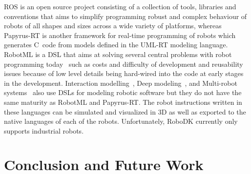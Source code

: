 \documentclass[runningheads]{llncs}
\newcommand{\cpp}{C\nolinebreak\hspace{-.05em}\raisebox{.4ex}{\tiny\bf +}\nolinebreak\hspace{-.10em}\raisebox{.4ex}{\tiny\bf +}}
\begin{document}
ROS is an open source project consisting of a collection of tools, libraries and conventions that aims to simplify programming robust and complex behaviour of robots of all shapes and sizes across a wide variety of platforms, whereas
Papyrus-RT is another framework for real-time programming of robots which generates \cpp\ code from models defined in the UML-RT modeling language.
RobotML is a DSL that aims at solving several central problems with robot programming today~\cite{Dhouib2012robotml} such as costs and difficulty of development and reusability issues because of low level details being hard-wired into the code at early stages in the development. 
Interaction modelling~\cite{cornelius2017model}, Deep modeling~\cite{atkinson2014towards}, and Multi-robot systems~\cite{di2014family} also use DSLs for modeling robotic software but they do not have the same maturity as RobotML and Papyrus-RT.
The robot instructions written in these languages can be simulated and visualized in 3D as well as exported to the native languages of each of the robots.
Unfortunately, RoboDK currently only supports industrial robots.

\section{Conclusion and Future Work} 

\end{document}
